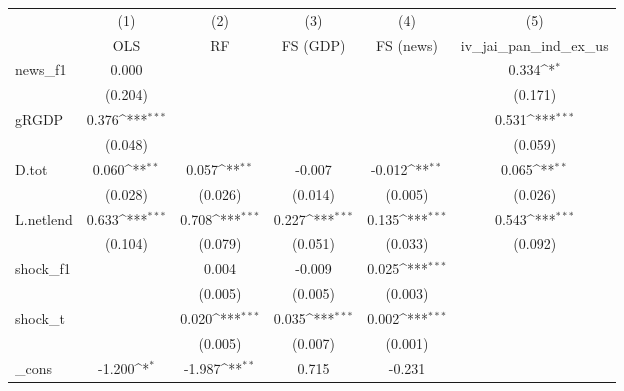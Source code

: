 {
\def\sym#1{\ifmmode^{#1}\else\(^{#1}\)\fi}
\begin{tabular}{l*{5}{c}}
\toprule
            &\multicolumn{1}{c}{(1)}&\multicolumn{1}{c}{(2)}&\multicolumn{1}{c}{(3)}&\multicolumn{1}{c}{(4)}&\multicolumn{1}{c}{(5)}\\
            &\multicolumn{1}{c}{OLS}&\multicolumn{1}{c}{RF}&\multicolumn{1}{c}{FS (GDP)}&\multicolumn{1}{c}{FS (news)}&\multicolumn{1}{c}{iv\_jai\_pan\_ind\_ex\_us}\\
\midrule
news\_f1     &       0.000         &                     &                     &                     &       0.334\sym{*}  \\
            &     (0.204)         &                     &                     &                     &     (0.171)         \\
\addlinespace
gRGDP       &       0.376\sym{***}&                     &                     &                     &       0.531\sym{***}\\
            &     (0.048)         &                     &                     &                     &     (0.059)         \\
\addlinespace
D.tot       &       0.060\sym{**} &       0.057\sym{**} &      -0.007         &      -0.012\sym{**} &       0.065\sym{**} \\
            &     (0.028)         &     (0.026)         &     (0.014)         &     (0.005)         &     (0.026)         \\
\addlinespace
L.netlend   &       0.633\sym{***}&       0.708\sym{***}&       0.227\sym{***}&       0.135\sym{***}&       0.543\sym{***}\\
            &     (0.104)         &     (0.079)         &     (0.051)         &     (0.033)         &     (0.092)         \\
\addlinespace
shock\_f1    &                     &       0.004         &      -0.009         &       0.025\sym{***}&                     \\
            &                     &     (0.005)         &     (0.005)         &     (0.003)         &                     \\
\addlinespace
shock\_t     &                     &       0.020\sym{***}&       0.035\sym{***}&       0.002\sym{***}&                     \\
            &                     &     (0.005)         &     (0.007)         &     (0.001)         &                     \\
\addlinespace
\_cons      &      -1.200\sym{*}  &      -1.987\sym{**} &       0.715         &      -0.231         &                     \\

\end{tabular}}
